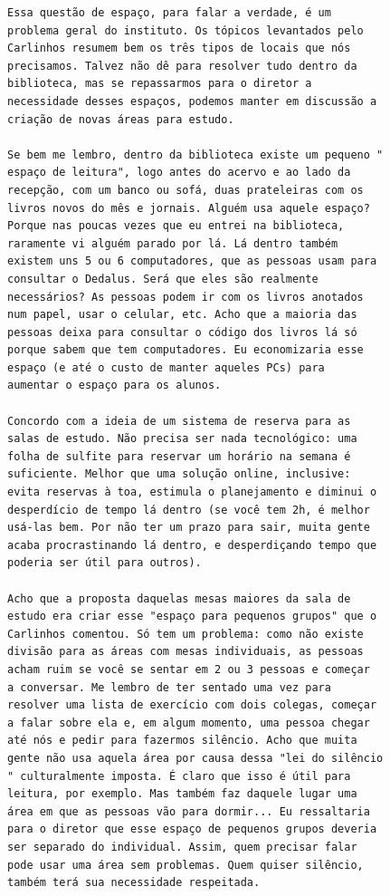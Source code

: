 \documentclass[titlepage]{article}
\begin{document}
\begin{lstlisting}[caption=Enviado por Renato Cordeiro]
Essa questão de espaço, para falar a verdade, é um 
problema geral do instituto. Os tópicos levantados pelo 
Carlinhos resumem bem os três tipos de locais que nós 
precisamos. Talvez não dê para resolver tudo dentro da 
biblioteca, mas se repassarmos para o diretor a 
necessidade desses espaços, podemos manter em discussão a 
criação de novas áreas para estudo.

Se bem me lembro, dentro da biblioteca existe um pequeno "
espaço de leitura", logo antes do acervo e ao lado da 
recepção, com um banco ou sofá, duas prateleiras com os 
livros novos do mês e jornais. Alguém usa aquele espaço? 
Porque nas poucas vezes que eu entrei na biblioteca, 
raramente vi alguém parado por lá. Lá dentro também 
existem uns 5 ou 6 computadores, que as pessoas usam para 
consultar o Dedalus. Será que eles são realmente 
necessários? As pessoas podem ir com os livros anotados 
num papel, usar o celular, etc. Acho que a maioria das 
pessoas deixa para consultar o código dos livros lá só 
porque sabem que tem computadores. Eu economizaria esse 
espaço (e até o custo de manter aqueles PCs) para 
aumentar o espaço para os alunos.

Concordo com a ideia de um sistema de reserva para as 
salas de estudo. Não precisa ser nada tecnológico: uma 
folha de sulfite para reservar um horário na semana é 
suficiente. Melhor que uma solução online, inclusive: 
evita reservas à toa, estimula o planejamento e diminui o 
desperdício de tempo lá dentro (se você tem 2h, é melhor 
usá-las bem. Por não ter um prazo para sair, muita gente 
acaba procrastinando lá dentro, e desperdiçando tempo que 
poderia ser útil para outros).

Acho que a proposta daquelas mesas maiores da sala de 
estudo era criar esse "espaço para pequenos grupos" que o 
Carlinhos comentou. Só tem um problema: como não existe 
divisão para as áreas com mesas individuais, as pessoas 
acham ruim se você se sentar em 2 ou 3 pessoas e começar 
a conversar. Me lembro de ter sentado uma vez para 
resolver uma lista de exercício com dois colegas, começar 
a falar sobre ela e, em algum momento, uma pessoa chegar 
até nós e pedir para fazermos silêncio. Acho que muita 
gente não usa aquela área por causa dessa "lei do silêncio
" culturalmente imposta. É claro que isso é útil para 
leitura, por exemplo. Mas também faz daquele lugar uma 
área em que as pessoas vão para dormir... Eu ressaltaria 
para o diretor que esse espaço de pequenos grupos deveria 
ser separado do individual. Assim, quem precisar falar 
pode usar uma área sem problemas. Quem quiser silêncio, 
também terá sua necessidade respeitada.


\end{lstlisting}
\end{document}
